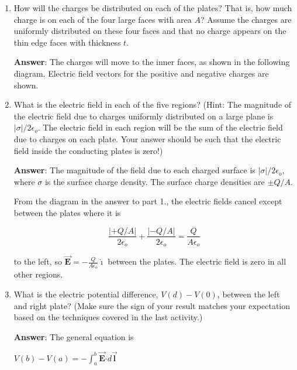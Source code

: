 \documentclass{article}
\newcommand{\ds}[0]{\displaystyle}
\newcommand{\ihat}[0]{\hat{\boldsymbol{\imath}}}
\newcommand{\bfvec}[1]{\vec{\mathbf{#1}}}
\newcommand{\bfcdot}[0]{\boldsymbol{\cdot}}
\begin{document}
\begin{enumerate}

  \item How will the charges be distributed on each of the plates? That is, how much charge is on each of the four large faces with area $A$? Assume the charges are uniformly distributed on these four faces and that no charge appears on the thin edge faces with thickness $t$.

        \ifsolutions
        {\bf Answer}: The charges will move to the inner faces, as shown in the following diagram. Electric field vectors for the positive and negative charges are shown.

        
        \else
        \vskip 36pt
        \fi

  \item What is the electric field in each of the five regions? (Hint: The magnitude of the electric field due to charges uniformly distributed on a large plane is $|\sigma|/2\epsilon_o$. The electric field in each region will be the sum of the electric field due to charges on each plate. Your answer should be such that the electric field inside the conducting plates is zero!)

        \ifsolutions
        {\bf Answer}: The magnitude of the field due to each charged surface is $|\sigma|/2\epsilon_o$, where $\sigma$ is the surface charge density. The surface charge densities are $\pm Q/A$.

        

        From the diagram in the answer to part 1., the electric fields cancel except between the plates where it is 

        $$\frac{|+Q/A|}{2\epsilon_o} + \frac{|-Q/A|}{2\epsilon_o} = \frac{Q}{A\epsilon_o}$$

        to the left, so $\ds\bfvec{E}=-\frac{Q}{A\epsilon_o}\ihat$ between the plates. The electric field is zero in all other regions.
        \else
        \vskip 36pt
        \fi

  \item What is the electric potential difference, $V(d)-V(0)$, between the left and right plate? (Make sure the sign of your result matches your expectation based on the techniques covered in the last activity.)

        \ifsolutions
        {\bf Answer}: The general equation is

        $\ds V(b)-V(a) = -\int_a^b\bfvec{E}\bfcdot d\bfvec{l}$


\end{enumerate}
\end{document}
